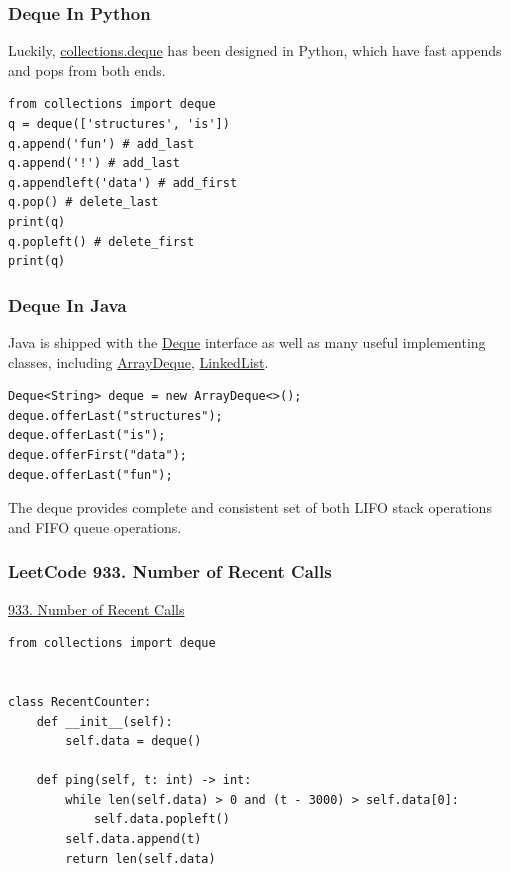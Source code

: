 \documentclass[aspectratio=169, 14pt]{beamer}
\begin{document}
\begin{frame}[fragile]
    \frametitle{Deque In Python}

    Luckily, \href{https://docs.python.org/3/library/collections.html}{collections.deque} has been designed in Python, which have fast appends and pops from both ends.

    \begin{verbatim}
from collections import deque
q = deque(['structures', 'is'])
q.append('fun') # add_last
q.append('!') # add_last
q.appendleft('data') # add_first
q.pop() # delete_last
print(q)
q.popleft() # delete_first
print(q)
    \end{verbatim} 

\end{frame}

\begin{frame}[fragile]
    \frametitle{Deque In Java}
    Java is shipped with the \href{https://docs.oracle.com/en/java/javase/11/docs/api/java.base/java/util/Deque.html}{Deque} interface as well as many useful implementing classes, including \href{https://docs.oracle.com/en/java/javase/11/docs/api/java.base/java/util/ArrayDeque.html}{ArrayDeque}, \href{https://docs.oracle.com/en/java/javase/11/docs/api/java.base/java/util/LinkedList.html}{LinkedList}.    
    \begin{verbatim}
Deque<String> deque = new ArrayDeque<>();
deque.offerLast("structures");
deque.offerLast("is");
deque.offerFirst("data");
deque.offerLast("fun");
    \end{verbatim} 
\end{frame}

{
\begin{frame}[standout]
The \alert{deque} provides complete and consistent set of both LIFO stack operations and FIFO queue operations.
\end{frame}
}

\begin{frame}[fragile]
    \frametitle{LeetCode 933. Number of Recent Calls}
\href{https://leetcode.com/problems/number-of-recent-calls/}{933. Number of Recent Calls}
\pause
\begin{verbatim}
from collections import deque


class RecentCounter:
    def __init__(self):
        self.data = deque()

    def ping(self, t: int) -> int:
        while len(self.data) > 0 and (t - 3000) > self.data[0]:
            self.data.popleft()
        self.data.append(t)
        return len(self.data)
\end{verbatim}
\end{frame}
\end{document}
